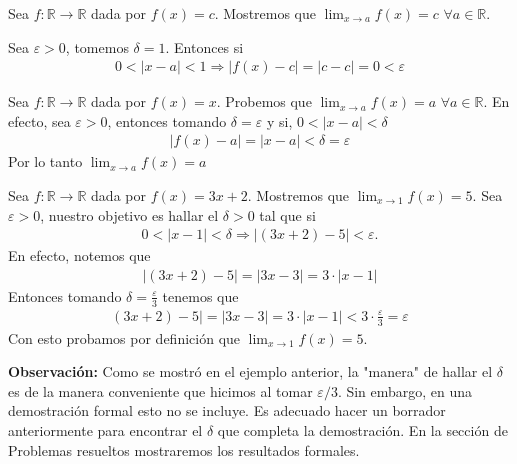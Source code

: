 \documentclass[12pt]{book}
\begin{document}
\begin{eje}{}{}
    Sea $f: \mathbb{R} \to \mathbb{R}$ dada por $f(x)=c$. Mostremos que $ \displaystyle \lim_{x \to a} f(x)=c$ $\forall a \in \mathbb{R}$.

    Sea $\varepsilon >0$, tomemos $\delta = 1$. Entonces si 
    \begin{align*}
        0<|x-a|<1 \Longrightarrow|f(x)-c|=|c-c|=0<\varepsilon
    \end{align*}
\end{eje}
\begin{eje}{}{}
    Sea $f : \mathbb{R} \to \mathbb{R}$ dada por $f(x)=x$. Probemos que $ \displaystyle \lim_{x \to a} f(x)=a$ $\forall a \in \mathbb{R}$. En efecto, sea $\varepsilon>0$, entonces tomando $\delta =\varepsilon$ y si, $0<|x-a|<\delta$
    \begin{align*}
        |f(x)-a|=|x-a|<\delta =\varepsilon
    \end{align*}
    Por lo tanto  $ \displaystyle \lim_{x \to a} f(x)=a$ 
\end{eje}
\begin{eje}{}{}
    Sea $f: \mathbb{R} \to \mathbb{R}$ dada por $f(x)=3x+2$. Mostremos que $ \displaystyle \lim_{x \to 1} f(x)=5$. Sea $\varepsilon>0$, nuestro objetivo es hallar el $\delta>0$ tal que si 
    \begin{align*}
        0<|x-1|<\delta  \Longrightarrow |(3x+2)-5|<\varepsilon.
    \end{align*}
    En efecto, notemos que 
    \begin{align*}
        |(3x+2)-5|=|3x-3|=3\cdot |x-1|
    \end{align*}
    Entonces tomando $\delta = \displaystyle \frac{\varepsilon}{3}$ tenemos que 
    \begin{align*}
        (3x+2)-5|=|3x-3|=3\cdot |x-1| < 3 \cdot \frac{\varepsilon}{3}=\varepsilon
    \end{align*}
    Con esto probamos por definición que $ \displaystyle \lim_{x \to 1} f(x)=5$.
\end{eje}

\textbf{Observación:} Como se mostró en el ejemplo anterior, la "manera" de hallar el $\delta$ es de la manera conveniente que hicimos al tomar $\varepsilon/3$. Sin embargo, en una demostración formal esto no se incluye. Es adecuado hacer un borrador anteriormente para encontrar el $\delta$ que completa la demostración. En la sección de {\Large Problemas resueltos} mostraremos los resultados formales.
\end{document}
